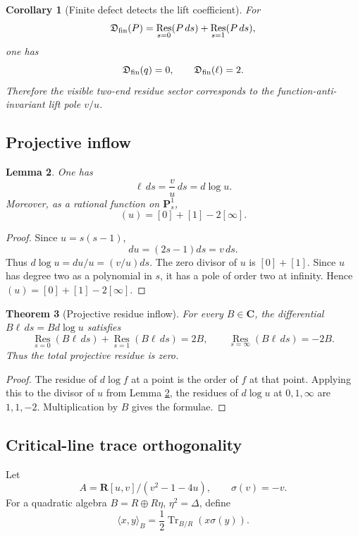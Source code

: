 \documentclass[11pt]{article}
\newcommand{\C}{\mathbf C}
\newcommand{\R}{\mathbf R}
\newcommand{\Res}{\operatorname*{Res}}
\newcommand{\Tr}{\operatorname{Tr}}
\theoremstyle{plain}
\newtheorem{theorem}{Theorem}[section]
\newtheorem{lemma}[theorem]{Lemma}
\newtheorem{corollary}[theorem]{Corollary}
\theoremstyle{definition}
\numberwithin{equation}{section}
\begin{document}
\begin{corollary}[Finite defect detects the lift coefficient]
For
\[
 \mathfrak D_{\rm fin}(P)=\Res_{s=0}(P\,ds)+\Res_{s=1}(P\,ds),
\]
one has
\[
 \mathfrak D_{\rm fin}(q)=0,
 \qquad
 \mathfrak D_{\rm fin}(\ell)=2.
\]
Therefore the visible two-end residue sector corresponds to the function-anti-invariant lift pole \(v/u\).
\end{corollary}

\subsection{Projective inflow}

\begin{lemma}\label{lem:dlogu}
One has
\[
 \ell\,ds=\frac vu\,ds=d\log u.
\]
Moreover, as a rational function on \(\mathbf P^1_s\),
\[
 (u)=[0]+[1]-2[\infty].
\]
\end{lemma}

\begin{proof}
Since \(u=s(s-1)\),
\[
 du=(2s-1)ds=v\,ds.
\]
Thus \(d\log u=du/u=(v/u)ds\).  The zero divisor of \(u\) is \([0]+[1]\).  Since \(u\) has degree two as a polynomial in \(s\), it has a pole of order two at infinity.  Hence \((u)=[0]+[1]-2[\infty]\).
\end{proof}

\begin{theorem}[Projective residue inflow]\label{thm:projective-inflow}
For every \(B\in\C\), the differential \(B\ell\,ds=Bd\log u\) satisfies
\[
 \Res_{s=0}(B\ell\,ds)+\Res_{s=1}(B\ell\,ds)=2B,
 \qquad
 \Res_{s=\infty}(B\ell\,ds)=-2B.
\]
Thus the total projective residue is zero.
\end{theorem}

\begin{proof}
The residue of \(d\log f\) at a point is the order of \(f\) at that point.  Applying this to the divisor of \(u\) from Lemma \ref{lem:dlogu}, the residues of \(d\log u\) at \(0,1,\infty\) are \(1,1,-2\).  Multiplication by \(B\) gives the formulae.
\end{proof}

\subsection{Critical-line trace orthogonality}

Let
\[
 A=\R[u,v]/(v^2-1-4u),
 \qquad
 \sigma(v)=-v.
\]
For a quadratic algebra \(B=R\oplus R\eta\), \(\eta^2=\Delta\), define
\[
 \langle x,y\rangle_B=\frac12\Tr_{B/R}(x\sigma(y)).
\]
\end{document}
